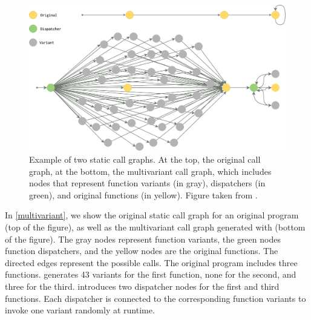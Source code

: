 \begin{figure}
    \centering
  \includegraphics[width=.8\linewidth]{diagrams/CFG.png}
  \caption{Example of two static call graphs. At the top, the original call graph, at the bottom, the multivariant call graph, which includes nodes that represent function variants (in gray), dispatchers (in green), and original functions  (in yellow). Figure taken from \cite{Lic}.
}
  \label{multivariant}
\end{figure}

In \autoref{multivariant}, we show the original static call graph for an original program (top of the figure), as well as the multivariant call graph generated with \tool (bottom of the figure).
The gray nodes represent function variants, the green nodes function dispatchers, and the yellow nodes are the original functions.
The directed edges represent the possible calls.
The original program includes three functions. \tool generates 43 variants for the first function, none for the second, and three for the third. 
\tool introduces two dispatcher nodes for the first and third functions. Each dispatcher is connected to the corresponding function variants to invoke one variant randomly at runtime.


\lstset{
    language=llvm,
    basicstyle=\footnotesize\ttfamily,
    columns=fullflexible,
    breaklines=true,
    numbers=none,
    stepnumber=1,
    float
}

